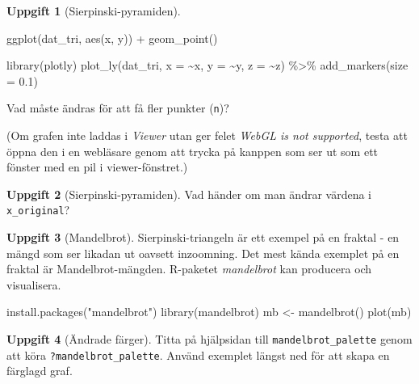 \documentclass[
]{book}
\newenvironment{Shaded}{\begin{snugshade}}{\end{snugshade}}
\newcommand{\AttributeTok}[1]{\textcolor[rgb]{0.77,0.63,0.00}{#1}}
\newcommand{\FloatTok}[1]{\textcolor[rgb]{0.00,0.00,0.81}{#1}}
\newcommand{\FunctionTok}[1]{\textcolor[rgb]{0.00,0.00,0.00}{#1}}
\newcommand{\NormalTok}[1]{#1}
\newcommand{\OtherTok}[1]{\textcolor[rgb]{0.56,0.35,0.01}{#1}}
\newcommand{\SpecialCharTok}[1]{\textcolor[rgb]{0.00,0.00,0.00}{#1}}
\newcommand{\StringTok}[1]{\textcolor[rgb]{0.31,0.60,0.02}{#1}}
\theoremstyle{definition}
\theoremstyle{definition}
\theoremstyle{definition}
\newtheorem{exercise}{Uppgift}[chapter]
\theoremstyle{definition}
\theoremstyle{remark}
\begin{document}
\begin{exercise}[Sierpinski-pyramiden]
\begin{Shaded}
\begin{Highlighting}[]
\FunctionTok{ggplot}\NormalTok{(dat\_tri, }\FunctionTok{aes}\NormalTok{(x, y)) }\SpecialCharTok{+}
  \FunctionTok{geom\_point}\NormalTok{()}

\FunctionTok{library}\NormalTok{(plotly)}
\FunctionTok{plot\_ly}\NormalTok{(dat\_tri, }\AttributeTok{x =} \SpecialCharTok{\textasciitilde{}}\NormalTok{x, }\AttributeTok{y =} \SpecialCharTok{\textasciitilde{}}\NormalTok{y, }\AttributeTok{z =} \SpecialCharTok{\textasciitilde{}}\NormalTok{z) }\SpecialCharTok{\%\textgreater{}\%} 
  \FunctionTok{add\_markers}\NormalTok{(}\AttributeTok{size =} \FloatTok{0.1}\NormalTok{)}
\end{Highlighting}
\end{Shaded}

Vad måste ändras för att få fler punkter (\texttt{n})?

(Om grafen inte laddas i \emph{Viewer} utan ger felet \emph{WebGL is not supported}, testa att öppna den i en webläsare genom att trycka på kanppen som ser ut som ett fönster med en pil i viewer-fönstret.)
\end{exercise}

\begin{exercise}[Sierpinski-pyramiden]
Vad händer om man ändrar värdena i \texttt{x\_original}?
\end{exercise}

\begin{exercise}[Mandelbrot]

Sierpinski-triangeln är ett exempel på en fraktal - en mängd som ser likadan ut oavsett inzoomning. Det mest kända exemplet på en fraktal är Mandelbrot-mängden. R-paketet \emph{mandelbrot} kan producera och visualisera.

\begin{Shaded}
\begin{Highlighting}[]
\FunctionTok{install.packages}\NormalTok{(}\StringTok{"mandelbrot"}\NormalTok{)}
\FunctionTok{library}\NormalTok{(mandelbrot)}
\NormalTok{mb }\OtherTok{\textless{}{-}} \FunctionTok{mandelbrot}\NormalTok{()}
\FunctionTok{plot}\NormalTok{(mb)}
\end{Highlighting}
\end{Shaded}

\end{exercise}

\begin{exercise}[Ändrade färger]
Titta på hjälpsidan till \texttt{mandelbrot\_palette} genom att köra \texttt{?mandelbrot\_palette}. Använd exemplet längst ned för att skapa en färglagd graf.
\end{exercise}
\end{document}
